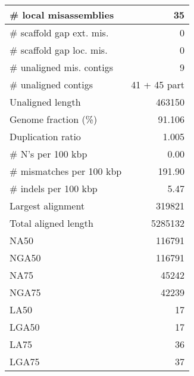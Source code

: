 \documentclass[12pt,a4paper]{article}
\begin{document}
\begin{table}[ht]
\begin{center}
\begin{tabular}{|l*{1}{|r}|}
\# local misassemblies & 35 \\ \hline
\# scaffold gap ext. mis. & 0 \\ \hline
\# scaffold gap loc. mis. & 0 \\ \hline
\# unaligned mis. contigs & 9 \\ \hline
\# unaligned contigs & 41 + 45 part \\ \hline
Unaligned length & 463150 \\ \hline
Genome fraction (\%) & 91.106 \\ \hline
Duplication ratio & 1.005 \\ \hline
\# N's per 100 kbp & 0.00 \\ \hline
\# mismatches per 100 kbp & 191.90 \\ \hline
\# indels per 100 kbp & 5.47 \\ \hline
Largest alignment & 319821 \\ \hline
Total aligned length & 5285132 \\ \hline
NA50 & 116791 \\ \hline
NGA50 & 116791 \\ \hline
NA75 & 45242 \\ \hline
NGA75 & 42239 \\ \hline
LA50 & 17 \\ \hline
LGA50 & 17 \\ \hline
LA75 & 36 \\ \hline
LGA75 & 37 \\ \hline
\end{tabular}
\end{center}
\end{table}
\end{document}

